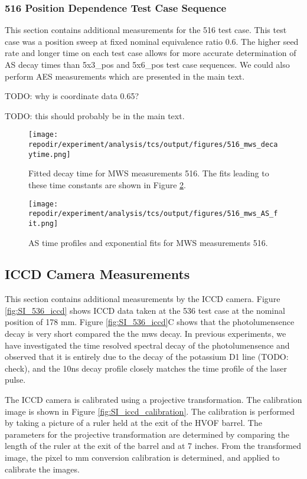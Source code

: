 \clearpage
\subsubsection{516 Position Dependence Test Case Sequence}

This section contains additional measurements for the 516 test case. This test case was a position sweep at fixed nominal equivalence ratio 0.6. The higher seed rate and longer time on each test case allows for more accurate determination of AS decay times than 5x3\_pos and 5x6\_pos test case sequences. We could also perform AES measurements which are presented in the main text. 



TODO: why is coordinate data 0.65? 

TODO: this should probably be in the main text.

\begin{figure}[]
\centering
\texttt{[image: \\repodir/experiment/analysis/tcs/output/figures/516\_mws\_decaytime.png]}
\caption{Fitted decay time for MWS measurements 516. The fits leading to these time constants are shown in Figure \ref{fig:516_mws_AS_fit}.}
\label{fig:SI_516_mws_decaytime}
\end{figure}

\begin{figure}[]
\centering
\texttt{[image: \\repodir/experiment/analysis/tcs/output/figures/516\_mws\_AS\_fit.png]}
\caption{AS time profiles and exponential fits for MWS measurements 516.}
\label{fig:516_mws_AS_fit}
\end{figure}


\clearpage
\subsection{ICCD Camera Measurements}

This section contains additional measurements by the ICCD camera. Figure \ref{fig:SI_536_iccd} shows ICCD data taken at the 536 test case at the nominal position of 178 mm. Figure \ref{fig:SI_536_iccd}C shows that the photolumensence decay is very short compared the the mws decay. In previous experiments, we have investigated the time resolved spectral decay of the photolumensence and observed that it is entirely due to the decay of the potassium D1 line (TODO: check), and the 10ns decay profile closely matches the time profile of the laser pulse. 

The ICCD camera is calibrated using a projective transformation. The calibration image is shown in Figure \ref{fig:SI_iccd_calibration}. The calibration is performed by taking a picture of a ruler held at the exit of the HVOF barrel. The parameters for the projective transformation are determined by comparing the length of the ruler at the exit of the barrel and at 7 inches. From the transformed image, the pixel to mm conversion calibration is determined, and applied to calibrate the images. 

